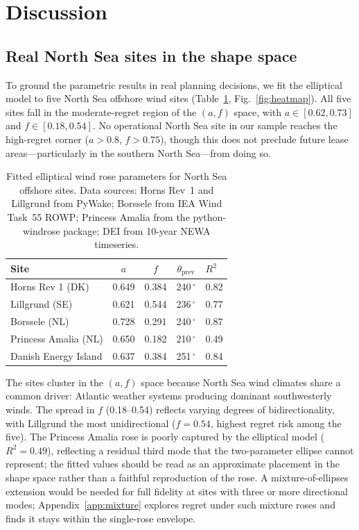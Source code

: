 \documentclass[wes, manuscript]{copernicus}
\begin{document}
\section{Discussion}\label{sec:discussion}

\subsection{Real North Sea sites in the shape space}

To ground the parametric results in real planning decisions, we fit the elliptical model to five North Sea offshore wind sites (Table~\ref{tab:sites}, Fig.~\ref{fig:heatmap}).
All five sites fall in the moderate-regret region of the $(a, f)$ space, with $a \in [0.62, 0.73]$ and $f \in [0.18, 0.54]$.
No operational North Sea site in our sample reaches the high-regret corner ($a > 0.8$, $f > 0.75$), though this does not preclude future lease areas---particularly in the southern North Sea---from doing so.

\begin{table}[htbp]
    \centering
    \caption{Fitted elliptical wind rose parameters for North Sea offshore sites.
    Data sources: Horns Rev~1 and Lillgrund from PyWake; Borssele from IEA Wind Task~55 ROWP; Princess Amalia from the python-windrose package; DEI from 10-year NEWA timeseries.}
    \label{tab:sites}
    \begin{tabular}{lcccl}
        \toprule
        Site & $a$ & $f$ & $\theta_\text{prev}$ & $R^2$ \\
        \midrule
        Horns Rev 1 (DK)       & 0.649 & 0.384 & 240\,$^\circ$ & 0.82 \\
        Lillgrund (SE)          & 0.621 & 0.544 & 236\,$^\circ$ & 0.77 \\
        Borssele (NL)           & 0.728 & 0.291 & 240\,$^\circ$ & 0.87 \\
        Princess Amalia (NL)    & 0.650 & 0.182 & 210\,$^\circ$ & 0.49 \\
        Danish Energy Island    & 0.637 & 0.384 & 251\,$^\circ$ & 0.84 \\
        \bottomrule
    \end{tabular}
\end{table}

The sites cluster in the $(a, f)$ space because North Sea wind climates share a common driver: Atlantic weather systems producing dominant southwesterly winds.
The spread in $f$ (0.18--0.54) reflects varying degrees of bidirectionality, with Lillgrund the most unidirectional ($f = 0.54$, highest regret risk among the five).
The Princess Amalia rose is poorly captured by the elliptical model ($R^2 = 0.49$), reflecting a residual third mode that the two-parameter ellipse cannot represent; the fitted values should be read as an approximate placement in the shape space rather than a faithful reproduction of the rose.
A mixture-of-ellipses extension \citep{Hart2025} would be needed for full fidelity at sites with three or more directional modes; Appendix~\ref{app:mixture} explores regret under such mixture roses and finds it stays within the single-rose envelope.
\end{document}
